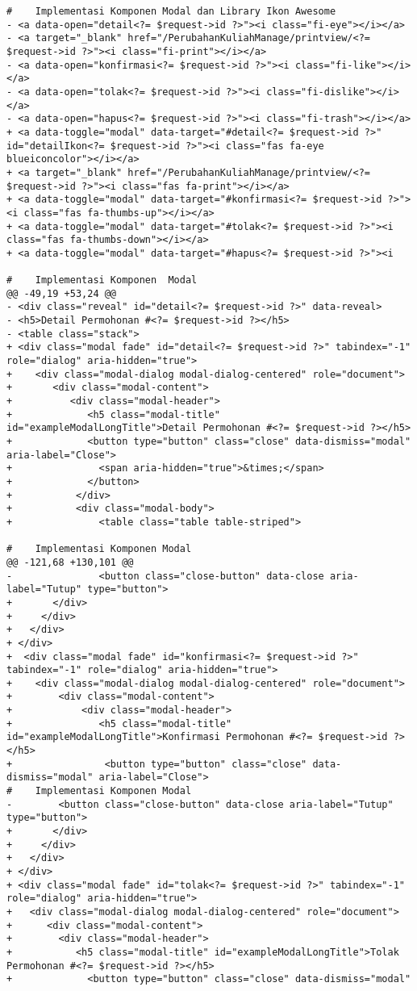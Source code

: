 \begin{lstlisting}
#    Implementasi Komponen Modal dan Library Ikon Awesome
- <a data-open="detail<?= $request->id ?>"><i class="fi-eye"></i></a>
- <a target="_blank" href="/PerubahanKuliahManage/printview/<?= $request->id ?>"><i class="fi-print"></i></a>
- <a data-open="konfirmasi<?= $request->id ?>"><i class="fi-like"></i></a>                                    
- <a data-open="tolak<?= $request->id ?>"><i class="fi-dislike"></i></a>
- <a data-open="hapus<?= $request->id ?>"><i class="fi-trash"></i></a>
+ <a data-toggle="modal" data-target="#detail<?= $request->id ?>" id="detailIkon<?= $request->id ?>"><i class="fas fa-eye blueiconcolor"></i></a>
+ <a target="_blank" href="/PerubahanKuliahManage/printview/<?= $request->id ?>"><i class="fas fa-print"></i></a>
+ <a data-toggle="modal" data-target="#konfirmasi<?= $request->id ?>"><i class="fas fa-thumbs-up"></i></a>
+ <a data-toggle="modal" data-target="#tolak<?= $request->id ?>"><i class="fas fa-thumbs-down"></i></a>
+ <a data-toggle="modal" data-target="#hapus<?= $request->id ?>"><i 

#    Implementasi Komponen  Modal
@@ -49,19 +53,24 @@
- <div class="reveal" id="detail<?= $request->id ?>" data-reveal>
- <h5>Detail Permohonan #<?= $request->id ?></h5>
- <table class="stack">
+ <div class="modal fade" id="detail<?= $request->id ?>" tabindex="-1" role="dialog" aria-hidden="true">
+    <div class="modal-dialog modal-dialog-centered" role="document">
+       <div class="modal-content">
+          <div class="modal-header">
+             <h5 class="modal-title" id="exampleModalLongTitle">Detail Permohonan #<?= $request->id ?></h5>
+             <button type="button" class="close" data-dismiss="modal" aria-label="Close">
+               <span aria-hidden="true">&times;</span>
+             </button>
+           </div>
+           <div class="modal-body">
+               <table class="table table-striped">

#    Implementasi Komponen Modal
@@ -121,68 +130,101 @@
-               <button class="close-button" data-close aria-label="Tutup" type="button">
+       </div>
+     </div>
+   </div>
+ </div>
+  <div class="modal fade" id="konfirmasi<?= $request->id ?>" tabindex="-1" role="dialog" aria-hidden="true">
+    <div class="modal-dialog modal-dialog-centered" role="document">
+        <div class="modal-content">
+            <div class="modal-header">
+               <h5 class="modal-title" id="exampleModalLongTitle">Konfirmasi Permohonan #<?= $request->id ?></h5>
+                <button type="button" class="close" data-dismiss="modal" aria-label="Close">
#    Implementasi Komponen Modal
-        <button class="close-button" data-close aria-label="Tutup" type="button">
+       </div>
+     </div>
+   </div>
+ </div>
+ <div class="modal fade" id="tolak<?= $request->id ?>" tabindex="-1" role="dialog" aria-hidden="true">
+   <div class="modal-dialog modal-dialog-centered" role="document">
+      <div class="modal-content">
+        <div class="modal-header">
+           <h5 class="modal-title" id="exampleModalLongTitle">Tolak Permohonan #<?= $request->id ?></h5>
+             <button type="button" class="close" data-dismiss="modal" 


\end{lstlisting}
